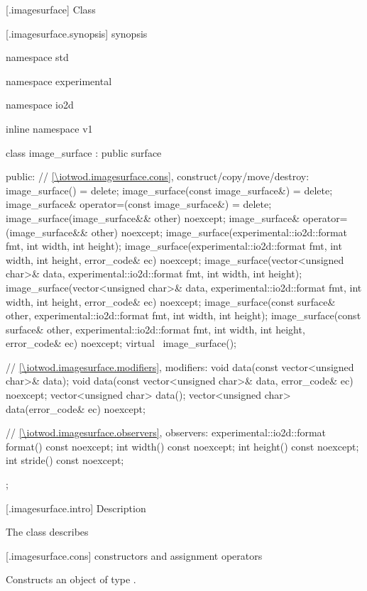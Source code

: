  [\iotwod.imagesurface] {Class }

 [\iotwod.imagesurface.synopsis] { synopsis}

\begin{codeblock}
namespace std { namespace experimental { namespace io2d { inline namespace v1 {
  class image_surface : public surface {
  public:
    // \ref{\iotwod.imagesurface.cons}, construct/copy/move/destroy:
    image_surface() = delete;
    image_surface(const image_surface&) = delete;
    image_surface& operator=(const image_surface&) = delete;
    image_surface(image_surface&& other) noexcept;
    image_surface& operator=(image_surface&& other) noexcept;
    image_surface(experimental::io2d::format fmt, int width, int height);
    image_surface(experimental::io2d::format fmt, int width, int height, 
      error_code& ec) noexcept;
    image_surface(vector<unsigned char>& data, experimental::io2d::format fmt,
      int width, int height);
    image_surface(vector<unsigned char>& data, experimental::io2d::format fmt,
      int width, int height, error_code& ec) noexcept;
    image_surface(const surface& other, experimental::io2d::format fmt, int width,
      int height);
    image_surface(const surface& other, experimental::io2d::format fmt, int width,
      int height, error_code& ec) noexcept;
    virtual ~image_surface();
    
    // \ref{\iotwod.imagesurface.modifiers}, modifiers:
    void data(const vector<unsigned char>& data);
    void data(const vector<unsigned char>& data, error_code& ec) noexcept;
    vector<unsigned char> data();
    vector<unsigned char> data(error_code& ec) noexcept;
    
    // \ref{\iotwod.imagesurface.observers}, observers:
    experimental::io2d::format format() const noexcept;
    int width() const noexcept;
    int height() const noexcept;
    int stride() const noexcept;
  };
} } } }
\end{codeblock}

 [\iotwod.imagesurface.intro] { Description}

\pnum
{}
The class  describes 

 [\iotwod.imagesurface.cons] { constructors and assignment operators}

\begin{itemdecl}
\end{itemdecl}
\begin{itemdescr}
	\pnum
	\effects
	Constructs an object of type .
	
	\pnum
	\postconditions
	
\end{itemdescr}


